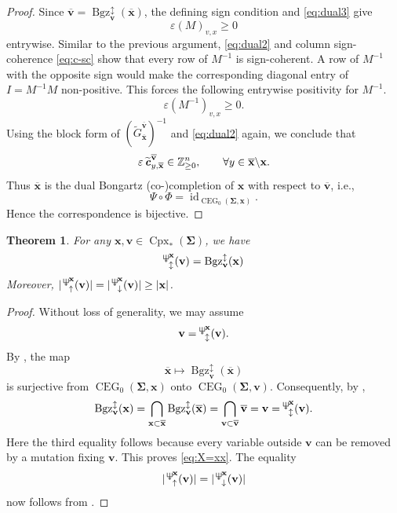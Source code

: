 \documentclass[11pt,reqno]{amsart}
\newcommand{\Neptune}{\mathord{\text{\tikz[baseline=-.5ex,scale=.13]{\draw[line width=.45pt] (0,0)--(0,1.8) (-.6,1.8)--(-.6,.8)--(.6,.8)--(.6,1.8) (-.35,.35)--(.35,.35);}}}}
\theoremstyle{plain}
\newtheorem{theorem}{Theorem}[section]
\theoremstyle{definition}
\numberwithin{equation}{section}
\newcommand\ZZ{\mathbb{Z}}
\newcommand\<{\langle}
\renewcommand\>{\rangle}
\newcommand{\id}{\operatorname{id}}
\newcommand{\CEG}{\operatorname{CEG}} %
\newcommand{\on}[1]{\operatorname{#1}}
\def\CCx{\on{Cpx}}   %
\def\vv{\mathbf{v}}
\def\sink{X}
\newcommand{\ccpt}[1]{\mathrm{#1}}%
\def\xevo{\ccpt{X}}%
\newcommand{\bfit}[1]{\textbf{\textit{#1}}}
\def\seeds{\mathbf{\Sigma}}
\def\xx{\mathbf{x}}%
\def\cvec{\bfit{c}}
\def\Gmat{{G}}
\def\supp{\on{supp}}
\newcommand{\Bgzpm}[2]{\operatorname{Bgz}^{\updownarrow}_{#2}(#1)}
\newcommand{\suppd}[1]{\operatorname{\Neptune}_{\downarrow}^{#1}}
\newcommand{\suppu}[1]{\operatorname{\Neptune}_{\uparrow}^{#1}}
\newcommand{\suppdu}[1]{\operatorname{\Neptune}_{\updownarrow}^{#1}}
\newcommand{\ol}[1]{\overline{#1}}
\def\ZZp{\ZZ_{\ge0}}
\begin{document}
\begin{proof}
Since $\ol{\vv}=\Bgzpm{\ol{\xx}}{\vv}$, the defining sign condition and \eqref{eq:dual3} give
\[
    \varepsilon (M)_{v,x}\ge0
\]
entrywise.
Similar to the previous argument, 
\eqref{eq:dual2} and column sign-coherence \eqref{eq:c-sc} show that every row of $M^{-1}$ is sign-coherent.
A row of $M^{-1}$ with the opposite sign would make the corresponding diagonal entry of $I=M^{-1}M$ non-positive.
This forces the following entrywise positivity for $M^{-1}$.
\[
    \varepsilon (M^{-1})_{v,x}\ge0.
\]
Using the block form of $(\widetilde{\Gmat}^{\ol{\vv}}_{\ol{\xx}})^{-1}$ and \eqref{eq:dual2} again, we conclude that
\[
    \varepsilon\,
    \widetilde{\cvec}^{\ol{\vv}}_{y,\ol{\xx}}
    \in\ZZp^n,
    \qquad
    \forall y\in\ol{\xx}\backslash\xx.
\]
Thus $\ol{\xx}$ is the dual Bongartz
(co-)completion of $\xx$ with respect to
$\ol{\vv}$, i.e.,
\[
    \Psi\circ\Phi=\id_{\CEG_0(\seeds,\xx)}.
\]
Hence the correspondence is bijective.
\end{proof}



\begin{theorem}\label{thm:X=xx}
For any $\xx,\vv\in\CCx_*(\seeds)$, we have
\begin{gather}\label{eq:X=xx}
    \suppdu{\xx}(\vv)=\Bgzpm{\xx}{\vv}
\end{gather}
Moreover, $|\suppu{\xx}(\vv)|=|\suppd{\xx}(\vv)|\ge|\xx|$.
\end{theorem}






\begin{proof}
Without loss of generality, we may assume
\[
    \vv=\suppdu{\xx}(\vv).
\]
By , the map
\[
    \ol{\xx}\longmapsto
    \Bgzpm{\ol{\xx}}{\vv}
\]
is surjective from $\CEG_0(\seeds,\xx)$ onto
$\CEG_0(\seeds,\vv)$.
Consequently, by ,
\begin{gather*}
    \Bgzpm{\xx}{\vv}=
    \bigcap_{\xx\subset\ol{\xx}}\Bgzpm{\ol{\xx}}{\vv}=
    \bigcap_{\vv\subset\ol{\vv}}\ol{\vv}=
    \vv=\suppdu{\xx}(\vv).
\end{gather*}
Here the third equality follows because every variable outside $\vv$ can be removed by a mutation fixing $\vv$.
This proves \eqref{eq:X=xx}.
The equality
\[
    |\suppu{\xx}(\vv)|
    =
    |\suppd{\xx}(\vv)|
\]
now follows from .
\end{proof}
\end{document}
